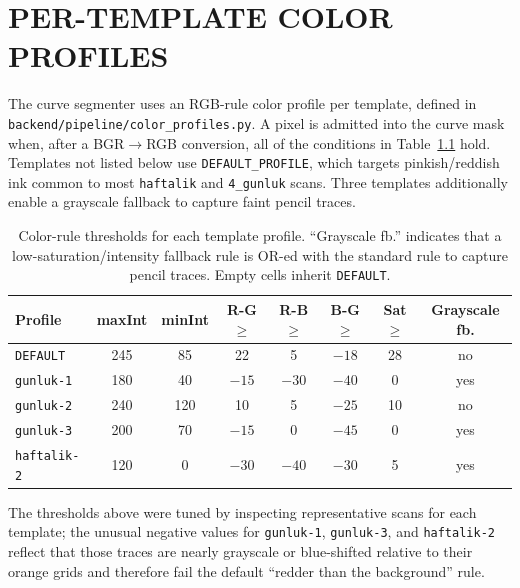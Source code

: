 \documentclass[a4paper,12pt]{report}
\begin{document}
\chapter{PER-TEMPLATE COLOR PROFILES}

The curve segmenter uses an RGB-rule color profile per template, defined in \texttt{backend/pipeline/color\_profiles.py}. A pixel is admitted into the curve mask when, after a BGR$\to$RGB conversion, all of the conditions in Table~\ref{table:color-rules} hold. Templates not listed below use \texttt{DEFAULT\_PROFILE}, which targets pinkish/reddish ink common to most \texttt{haftalik} and \texttt{4\_gunluk} scans. Three templates additionally enable a grayscale fallback to capture faint pencil traces.

\begin{table}[h!]
\caption[Per-template color profile parameters]{Color-rule thresholds for each template profile. ``Grayscale fb.'' indicates that a low-saturation/intensity fallback rule is OR-ed with the standard rule to capture pencil traces. Empty cells inherit \texttt{DEFAULT}.}
\begin{center}
\small
\begin{tabular}{|l|c|c|c|c|c|c|c|} \hline
\textbf{Profile} & \textbf{maxInt} & \textbf{minInt} & \textbf{R-G $\geq$} & \textbf{R-B $\geq$} & \textbf{B-G $\geq$} & \textbf{Sat $\geq$} & \textbf{Grayscale fb.} \\\hline
\texttt{DEFAULT}     & 245 & 85  &  22 &   5 & $-18$ & 28 & no  \\\hline
\texttt{gunluk-1}    & 180 & 40  & $-15$ & $-30$ & $-40$ &  0 & yes \\\hline
\texttt{gunluk-2}    & 240 & 120 &  10 &   5 & $-25$ & 10 & no  \\\hline
\texttt{gunluk-3}    & 200 & 70  & $-15$ &   0 & $-45$ &  0 & yes \\\hline
\texttt{haftalik-2}  & 120 &   0 & $-30$ & $-40$ & $-30$ &  5 & yes \\\hline
\end{tabular}
\label{table:color-rules}
\end{center}
\end{table}

The thresholds above were tuned by inspecting representative scans for each template; the unusual negative values for \texttt{gunluk-1}, \texttt{gunluk-3}, and \texttt{haftalik-2} reflect that those traces are nearly grayscale or blue-shifted relative to their orange grids and therefore fail the default ``redder than the background'' rule.
\end{document}
